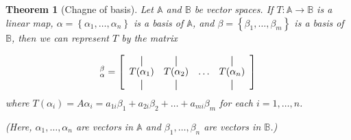\documentclass[10pt]{article}
\newtheorem{theorem}{Theorem}
\theoremstyle{definition}
\begin{document}
\begin{theorem}[Chagne of basis]
  Let $\mathbb{A}$ and $\mathbb{B}$ be vector spaces. If
  $T: \mathbb{A} \to \mathbb{B}$ is a linear map,
  $\alpha= \left\{\alpha_{1},\ldots,\alpha_{n}\right\}$ is a basis of
  $\mathbb{A}$, and $\beta= \left\{\beta_{1},\ldots,\beta_{m}\right\} $ is a
  basis of $\mathbb{B}$, then we can represent $T$ by the matrix
  \newcommand*{\vertbar}{\rule[-1ex]{0.5pt}{2.5ex}}
  \newcommand*{\horzbar}{\,\rule[.5ex]{2.5ex}{0.5pt}\,}

  \begin{equation*}
    [T]_{\alpha}^{\beta}
       = 
      \left[
        \begin{array}{cccc}
          \vertbar & \vertbar &        & \vertbar \\
          T(\alpha_{1})    & T(\alpha_{2})    & \ldots & T(\alpha_{n})    \\
          \vertbar & \vertbar &        & \vertbar 
        \end{array}
      \right]
    \end{equation*}
    where
    $T(\alpha_{i}) = A\alpha_{i} =
    a_{1i}\beta_{1}+a_{2i}\beta_{2}+\ldots+a_{mi}\beta_{m}$ for each
    $i=1,\ldots,n$.

    (Here, $\alpha_{1},\ldots,\alpha_{n}$ are vectors in $\mathbb{A}$ and
    $\beta_{1},\ldots,\beta_{n}$ are vectors in $\mathbb{B}$.)
\end{theorem}
\end{document}
